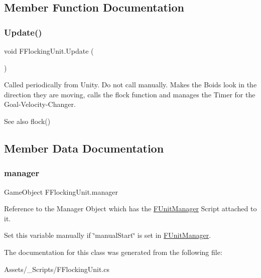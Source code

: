 \subsection{Member Function Documentation}
\mbox{\label{class_f_flocking_unit_a86c5e9761219f7e36329f497406ef47b}} 
\subsubsection{\texorpdfstring{Update()}{Update()}}
{\footnotesize\ttfamily void F\+Flocking\+Unit.\+Update (\begin{DoxyParamCaption}{ }\end{DoxyParamCaption})\hspace{0.3cm}{\ttfamily [protected]}}



Called periodically from Unity. Do not call manually. Makes the Boids look in the direction they are moving, calls the flock function and manages the Timer for the Goal-\/\+Velocity-\/\+Changer. 

\begin{DoxySeeAlso}{See also}
flock() 
\end{DoxySeeAlso}


\subsection{Member Data Documentation}
\mbox{\label{class_f_flocking_unit_af63c7d39a0269bb66be7f75c7ee830be}} 
\subsubsection{\texorpdfstring{manager}{manager}}
{\footnotesize\ttfamily Game\+Object F\+Flocking\+Unit.\+manager}



Reference to the Manager Object which has the \hyperlink{class_f_unit_manager}{F\+Unit\+Manager} Script attached to it. 

Set this variable manually if \char`\"{}manual\+Start\char`\"{} is set in \hyperlink{class_f_unit_manager}{F\+Unit\+Manager}. 

The documentation for this class was generated from the following file\+:\begin{DoxyCompactItemize}
\item 
Assets/\+\_\+\+Scripts/F\+Flocking\+Unit.\+cs\end{DoxyCompactItemize}
